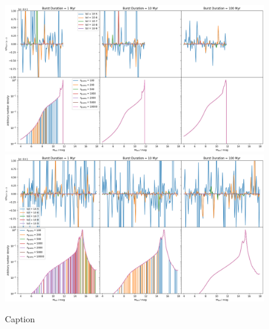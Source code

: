 \documentclass[fleqn,usenatbib]{mnras}
\begin{document}
\begin{figure}
    \centering
    \includegraphics[width=1.0\linewidth]{figures/fig_A_age_1000000000.png}
    \includegraphics[width=1.0\linewidth]{figures/fig_A_age_10000000000.png}
    \caption{Caption}
    \label{fig:enter-label}
\end{figure}

\bsp	%
\label{lastpage}
\end{document}

